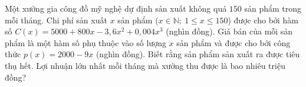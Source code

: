 \begin{ex}%
	Một xưởng gia công đồ mỹ nghệ dự định sản xuất không quá $150$ sản phẩm trong mỗi tháng. Chi phí sản xuất $x$ sản phẩm ($x \in \mathbb{N};\ 1 \leqslant x \leqslant 150$) được cho bởi hàm số $C(x)=5000+800x-3{,}6x^2+0{,}004x^3$ (nghìn đồng). Giá bán của mỗi sản phẩm là một hàm số phụ thuộc vào số lượng $x$ sản phẩm và được cho bởi công thức $p(x)=2000-9x$ (nghìn đồng). Biết rằng sản phẩm sản xuất ra được tiêu thụ hết. Lợi nhuận lớn nhất mỗi tháng mà xưởng thu được là bao nhiêu triệu đồng?
\end{ex}

